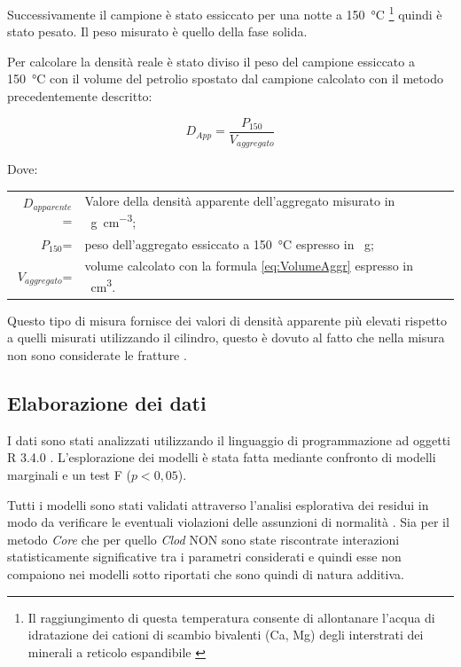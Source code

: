 \documentclass[11pt, a4paper, openright, titlepage, final, language = italian]{book}
\begin{document}
Successivamente il campione \`e stato essiccato per una notte a
\SI{150}{\degreeCelsius} \footnote{Il raggiungimento di questa
  temperatura consente di allontanare l'acqua di idratazione dei
  cationi di scambio bivalenti (Ca, Mg) degli interstrati dei minerali
  a reticolo espandibile \citep{Monnier_1973}} quindi \`e stato
pesato. Il peso misurato \`e quello della fase solida.


Per calcolare la densit\`a reale \`e stato diviso il peso del campione
essiccato a \SI{150}{\celsius} con il volume del petrolio spostato dal
campione calcolato con il metodo precedentemente descritto:

\begin{equation}
  \label{eq:densitapetrolio}
  D_{App} = \frac{P_{150}}{V_{aggregato}}
\end{equation}

Dove:\\
\begin{tabular}{rp{12cm}}
  $D_{apparente}$=  & Valore della densit\`a apparente dell'aggregato
                       misurato in \SI{}{\gram\per\cubic\cm};\\
  $P_{150}$=       & peso dell'aggregato essiccato a
                     \SI{150}{\celsius} espresso in \SI{}{\gram};\\
  $V_{aggregato}$=  & volume calcolato con la formula
                      \ref{eq:VolumeAggr} espresso in \SI{}{\cubic\cm}.
\end{tabular}

Questo tipo di misura fornisce dei valori di densit\`a apparente pi\`u
elevati rispetto a quelli misurati utilizzando il cilindro, questo \`e
dovuto al fatto che nella misura non sono considerate le fratture
\citep{tisdall1951comparison}.

\subsection{Elaborazione dei dati} %

I dati sono stati analizzati utilizzando il linguaggio di
programmazione ad oggetti R 3.4.0 \citep{r_programming}.
L'esplorazione dei modelli \citep{fox2002r, chambers1992statistical,
  faraway2004} è stata fatta mediante confronto di modelli marginali e
un test F ($p < 0,05$).

Tutti i modelli sono stati validati attraverso l'analisi esplorativa
dei residui in modo da verificare le eventuali violazioni delle
assunzioni di normalit\`a \citep{stefanini2007introduzione}. Sia per
il metodo \emph{Core} che per quello \emph{Clod} NON sono state
riscontrate interazioni statisticamente significative tra i parametri
considerati e quindi esse non compaiono nei modelli sotto riportati
che sono quindi di natura additiva.
\end{document}
